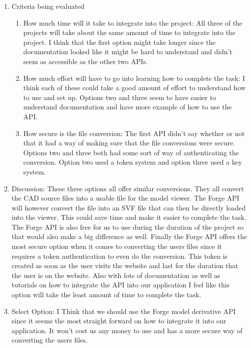 \documentclass[letterpaper, 10pt, draftclsnofoot, compsoc, onecolumn]{IEEEtran}
\begin{document}
\begin{enumerate}
\begin{itemize}
				\end{itemize}
			\item{Criteria being evaluated}
				\begin{enumerate}
					\item How much time will it take to integrate into the project: All three of the projects will take about the same amount of time to integrate into the 
					project. I think that the first option might take longer since the documentation looked like it might be hard to understand and didn't seem as accessible 
					as the other two APIs. 
					\item How much effort will have to go into learning how to complete the task: I think each of these could take a good amount of effort to understand how
					to use and set up. Options two and three seem to have easier to understand documentation and have more example of how to use the API. 
					\item How secure is the file conversion: The first API didn't say whether or not that it had a way of making sure that the file conversions were secure.
					Options two and three both had some sort of way of authenticating the conversion. Option two used a token system and option three used a key system.
				\end{enumerate}

			\item{Discussion:} These three options all offer similar conversions. They all convert the CAD source files into a usable file for the model viewer. The Forge API will however 
				convert the file into an SVF file that can then be directly loaded into the viewer. This could save time and make it easier to complete the task. The Forge API is also 
				free for us to use during the duration of the project so that would also make a big difference as well. Finally the Forge API offers the most secure option when it comes
				to converting the users files since it  requires a token authentication to even do the conversion. This token is created as soon as the user visits the website and last for 
				the duration that the user is on the website. Also with lots of documentation as well as tutorials on how to integrate the API into our application I feel like this option will
				take the least amount of time to complete the task. 

			\item{Select Option:}
				I Think that we should use the Forge model derivative API since it seems the most straight forward on how to integrate it into our application. It won't cost us any money
				to use and has a more secure way of converting the users files. 
		\end{enumerate}
\end{document}
